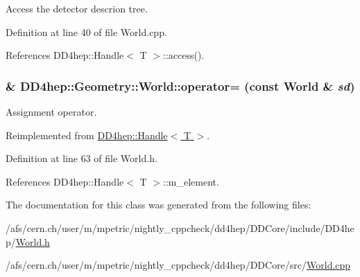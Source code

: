 Access the detector descrion tree. 

Definition at line 40 of file World.cpp.

References DD4hep::Handle$<$ T $>$::access().\hypertarget{class_d_d4hep_1_1_geometry_1_1_world_a8bff84a367718e07ad1e34ac48711327}{
\subsubsection[{operator=}]{\& DD4hep::Geometry::World::operator= (const {\bf World} \& {\em sd})}}
\label{class_d_d4hep_1_1_geometry_1_1_world_a8bff84a367718e07ad1e34ac48711327}


Assignment operator. 

Reimplemented from \hyperlink{class_d_d4hep_1_1_handle_a9bbf8f498df42e81ad26fb00233505a6}{DD4hep::Handle$<$ T $>$}.

Definition at line 63 of file World.h.

References DD4hep::Handle$<$ T $>$::m\_\-element.

The documentation for this class was generated from the following files:\begin{DoxyCompactItemize}
\item 
/afs/cern.ch/user/m/mpetric/nightly\_\-cppcheck/dd4hep/DDCore/include/DD4hep/\hyperlink{_world_8h}{World.h}\item 
/afs/cern.ch/user/m/mpetric/nightly\_\-cppcheck/dd4hep/DDCore/src/\hyperlink{_world_8cpp}{World.cpp}\end{DoxyCompactItemize}
